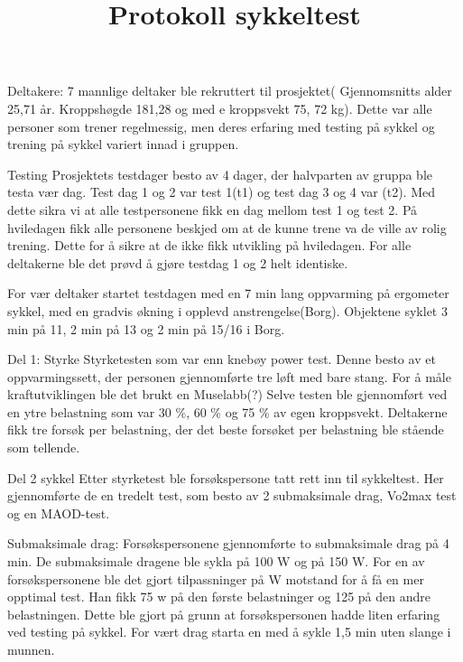 \documentclass[
  letterpaper,
  DIV=11,
  numbers=noendperiod]{scrartcl}
\title{Protokoll sykkeltest}
\author{}
\date{}
\begin{document}
\maketitle
\ifdefined\Shaded\renewenvironment{Shaded}{\begin{tcolorbox}[interior hidden, borderline west={3pt}{0pt}{shadecolor}, breakable, sharp corners, boxrule=0pt, frame hidden, enhanced]}{\end{tcolorbox}}\fi

Deltakere: 7 mannlige deltaker ble rekruttert til prosjektet(
Gjennomsnitts alder 25,71 år. Kroppshøgde 181,28 og med e kroppsvekt 75,
72 kg). Dette var alle personer som trener regelmessig, men deres
erfaring med testing på sykkel og trening på sykkel variert innad i
gruppen.

Testing Prosjektets testdager besto av 4 dager, der halvparten av gruppa
ble testa vær dag. Test dag 1 og 2 var test 1(t1) og test dag 3 og 4 var
(t2). Med dette sikra vi at alle testpersonene fikk en dag mellom test 1
og test 2. På hviledagen fikk alle personene beskjed om at de kunne
trene va de ville av rolig trening. Dette for å sikre at de ikke fikk
utvikling på hviledagen. For alle deltakerne ble det prøvd å gjøre
testdag 1 og 2 helt identiske.

For vær deltaker startet testdagen med en 7 min lang oppvarming på
ergometer sykkel, med en gradvis økning i opplevd anstrengelse(Borg).
Objektene syklet 3 min på 11, 2 min på 13 og 2 min på 15/16 i Borg.

Del 1: Styrke Styrketesten som var enn knebøy power test. Denne besto av
et oppvarmingssett, der personen gjennomførte tre løft med bare stang.
For å måle kraftutviklingen ble det brukt en Muselabb(?) Selve testen
ble gjennomført ved en ytre belastning som var 30 \%, 60 \% og 75 \% av
egen kroppsvekt. Deltakerne fikk tre forsøk per belastning, der det
beste forsøket per belastning ble stående som tellende.

Del 2 sykkel Etter styrketest ble forsøkspersone tatt rett inn til
sykkeltest. Her gjennomførte de en tredelt test, som besto av 2
submaksimale drag, Vo2max test og en MAOD-test.

Submaksimale drag: Forsøkspersonene gjennomførte to submaksimale drag på
4 min. De submaksimale dragene ble sykla på 100 W og på 150 W. For en av
forsøkspersonene ble det gjort tilpassninger på W motstand for å få en
mer opptimal test. Han fikk 75 w på den første belastninger og 125 på
den andre belastningen. Dette ble gjort på grunn at forsøkspersonen
hadde liten erfaring ved testing på sykkel. For vært drag starta en med
å sykle 1,5 min uten slange i munnen.
\end{document}
